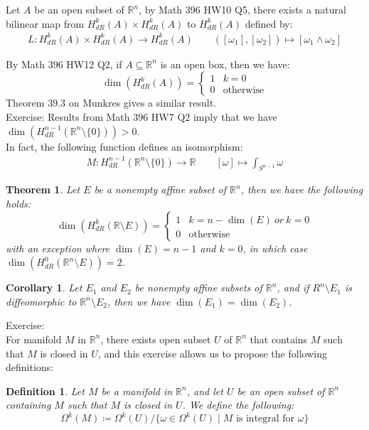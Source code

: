 \documentclass[15pt]{book}
\theoremstyle{break}
\theoremstyle{break}
\newtheorem{thm}{Theorem}[section]
\newtheorem{corT}[lem]{Corollary}
\newtheorem{defn}{Definition}[corL]
\newcommand{\R}{\mathbb{R}}
\newcommand{\exercise}{\color{green}Exercise: \color{black}}
\begin{document}
Let $A$ be an open subset of $\R^n$, by Math 396 HW10 Q5, there exists a natural bilinear map from $H_{dR}^k(A)\times H_{dR}^k(A) $ to $H_{dR}^k(A)$ defined by:
\begin{align*}
L:H_{dR}^k(A)\times H_{dR}^k(A)\to H_{dR}^k(A)\qquad ([\omega_1], [\omega_2]) \mapsto [\omega_1 \wedge \omega_2]
\end{align*}



By Math 396 HW12 Q2, if $A \subseteq \R^n$ is an open box, then we have: 
$$\dim(H^k_{dR}(A)) = \begin{cases} 1 & k=0 \\ 0 &\text{otherwise}  \end{cases}$$ 
Theorem 39.3 on Munkres gives a similar result.\\

\exercise
Results from Math 396 HW7 Q2 imply that we have $\dim(H^{n-1}_{dR}(\R^n \setminus \{0\})) >0$. \\In fact, the following function defines an isomorphism:
\begin{align*}
M: H^{n-1}_{dR} (\R^n \setminus \{0\}) \to \R \qquad [\omega ]\mapsto \int_{S^{n-1}}\omega
\end{align*}


\begin{thm}
Let $E$ be a nonempty affine subset of $\R^n$, then we have the following holds:
$$\dim(H^k_{dR}(\R \setminus E)) = \begin{cases} 1 & k=n-\dim(E) \ or\ k=0 \\ 0 &\text{otherwise}\end{cases}$$
with an exception where $\dim(E) = n-1$ and $k=0$, in which case $\dim(H_{dR}^0 (\R^n \setminus E)) = 2$.
\end{thm}

\begin{corT}
Let $E_1$ and $E_2$ be nonempty affine subsets of $\R^n$, and if $R^n \setminus E_1$ is diffeomorphic to $\R^n \setminus E_2$, then we have $\dim(E_1) = \dim(E_2)$. 
\end{corT}

\exercise \\
For manifold $M$ in $\R^n$, there exists open subset $U$ of $\R^n$ that contains $M$ such that $M$ is closed in $U$, and this exercise allows us to propose the following definitions:

\begin{defn}
Let $M$ be a manifold in $\R^n$, and let $U$ be an open subset of $\R^n$ containing $M$ such that $M$ is closed in $U$. We define the following:
$$\Omega^k(M) \coloneqq \Omega^k(U) /\{ \omega \in \Omega^k(U) \mid M \text{ is integral for }\omega\}$$
\end{defn}
\end{document}
